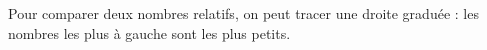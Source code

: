 Pour comparer deux nombres relatifs, on peut tracer une droite
graduée : les nombres les plus à gauche sont les plus petits.